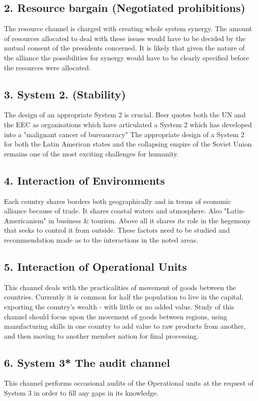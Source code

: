 \subsection*{2. Resource bargain (Negotiated prohibitions)}
The resource channel is charged with creating whole system synergy. The amount of resources allocated to deal with these issues would have to be decided by the mutual consent of the presidents concerned. It is likely that given the nature of the alliance the possibilities for synergy would have to be clearly specified before the resources were allocated.

\subsection*{3. System 2. (Stability)}
The design of an appropriate System 2 is crucial. Beer quotes both the UN and the EEC as organisations which have articulated a System 2 which has developed into a "malignant cancer of bureaucracy" The appropriate design of a System 2 for both the Latin American states and the collapsing empire of the Soviet Union remains one of the most exciting challenges for humanity.

\subsection*{4. Interaction of Environments}
Each country shares borders both geographically and in terms of economic alliance because of trade. It shares coastal waters and atmosphere. Also "Latin-Americanism" in business \& tourism. Above all it shares its role in the hegemony that seeks to control it from outside. These factors need to be studied and recommendation made as to the interactions in the noted areas.

\subsection*{5. Interaction of Operational Units}
This channel deals with the practicalities of movement of goods between the countries. Currently it is common for half the population to live in the capital, exporting the country's wealth - with little or no added value. Study of this channel should focus upon the movement of goods between regions, using manufacturing skills in one country to add value to raw products from another, and then moving to another member nation for final processing.

\subsection*{6. System 3* The audit channel}
This channel performs occasional audits of the Operational units at the request of System 3 in order to fill any gaps in its knowledge.

